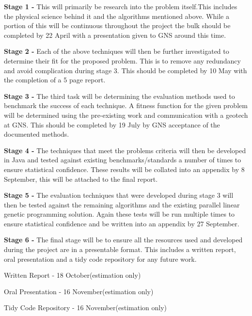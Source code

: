 \documentclass[11pt, a4paper, twoside, openright]{report}
\begin{document}
\begin{description}
\item{\bf Stage 1 -} This will primarily be research into the problem itself.This includes the physical science behind it and the algorithms mentioned above. While a portion of this will be continuous throughout the project the bulk should be completed by 22 April with a presentation given to GNS around this time.
\item{\bf Stage 2 -} Each of the above techniques will then be further investigated to determine
their fit for the proposed problem. This is to remove any redundancy and avoid complication during stage 3. This should be completed by 10 May with the completion of a 5 page report.
\item{\bf Stage 3 -} The third task will be determining the evaluation methods
used to benchmark the success of each technique. A fitness function for the given problem will be determined
using the pre-existing work and communication with a geotech at GNS. This should be completed by 19 July by GNS acceptance of the documented methods.
\item{\bf Stage 4 -} The techniques that meet the problems criteria will then be
developed in Java and tested against existing benchmarks/standards a number of times to ensure statistical confidence. These results will be collated into an appendix by 8 September, this will be attached to the final report.
\item{\bf Stage 5 -} The evaluation techniques that were developed during stage 3 will then be tested against the remaining algorithms and the existing parallel linear genetic programming solution. Again these tests will be run multiple times to ensure statistical confidence and be written into an appendix by 27 September.
\item{\bf Stage 6 -} The final stage will be to ensure all the resources used and developed during the project are in a presentable format. This includes a written report, oral presentation and a tidy code repository for any future work.
\begin{description}
\item{ Written Report - 18 October(estimation only)}
\item{ Oral Presentation - 16 November(estimation only)}
\item{ Tidy Code Repository - 16 November(estimation only)}
\end{description}
\end{description}
\end{document}
